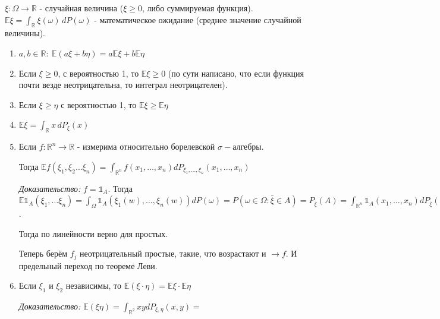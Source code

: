 
\begin{definition}
    $\xi : \Omega \rightarrow \mathbb{R}$ - случайная величина ($\xi \geq 0 $, либо суммируемая функция). $\mathbb{E} \xi = \int_{\mathbb{R}} \xi (\omega) \, dP(\omega)$ - математическое ожидание (среднее значение случайной величины).
\end{definition}

\begin{properties}
    \begin{enumerate}
        \item {
            $a, b \in \mathbb{R}: \ \mathbb{E} (a\xi + b \eta) = a\mathbb{E} \xi + b \mathbb{E} \eta$
        }
        \item {
            Если $\xi \geqslant 0$, с вероятностью 1, то $\mathbb{E} \xi \geqslant 0$ (по сути написано, что если функция почти везде неотрицательна, то интеграл неотрицателен).
        }
        \item {
            Если $\xi \geqslant \eta$ с вероятностью 1, то $\mathbb{E}\xi \geqslant \mathbb{E} \eta$
        }
        \item {
            $\mathbb{E} \xi = \int_{\mathbb{R}} x \, dP_{\xi} (x)$
        }
        \item {
            Если $f : \mathbb{R}^n \to \mathbb{R}$ - измерима относительно борелевской $\sigma-$алгебры.

            Тогда $\mathbb{E} f(\xi_1, \xi_2 \ldots \xi_n) = \int_{\mathbb{R}^n} f(x_1, \ldots, x_n) dP_{\xi_1, \ldots, \xi_n} (x_1, \ldots, x_n)$

            \textit{Доказательство:} $f = \mathds{1}_A$. Тогда $\mathbb{E} \mathds{1}_A (\xi_1, \ldots \xi_n) = 
            \int_{\Omega} \mathds{1}_A (\xi_1 (w), \ldots, \xi_n (w)) dP(\omega) = 
            P(\omega \in \Omega : \bar{\xi} \in A) = P_{\bar{\xi}} (A) = \int_{\mathbb{R}^n} \mathds{1}_A (x_1, \ldots, x_n) dP_{\bar{\xi}} (x_1, \ldots, x_n)$.

            Тогда по линейности верно для простых.

            Теперь берём $f_j$ неотрицательный простые, такие, что возрастают и $\rightarrow f$. И предельный
            переход по теореме Леви.
        }
        \item {
            Если $\xi_1$ и $\xi_2$ независимы, то $\mathbb{E} (\xi \cdot \eta) = \mathbb{E} \xi \cdot \mathbb{E} \eta$

            \textit{Доказательство: } $\mathbb{E} (\xi \eta) = \int_{\mathbb{R}^2} xy dP_{\xi, \eta} (x, y) = $
            
}
\end{enumerate}
\end{properties}
